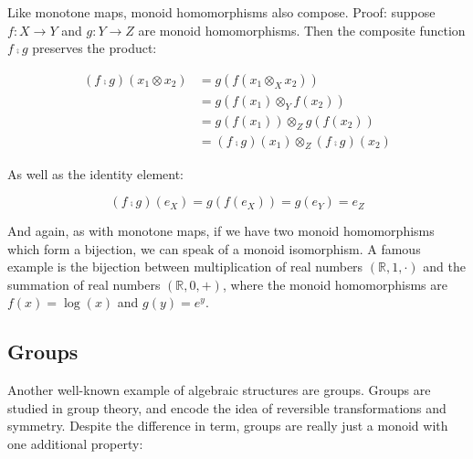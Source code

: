 \documentclass[
]{book}
\theoremstyle{definition}
\theoremstyle{definition}
\theoremstyle{definition}
\theoremstyle{definition}
\theoremstyle{remark}
\begin{document}
Like monotone maps, monoid homomorphisms also compose. Proof: suppose \(f: X \to Y\) and \(g: Y \to Z\) are monoid homomorphisms. Then the composite function \(f ⨾g\) preserves the product:

\begin{align}
(f ⨾g)(x_1 \otimes x_2) & = g(f(x_1 \otimes_X x_2)) \\
& = g(f(x_1) \otimes_Y f(x_2)) \\
& = g(f(x_1)) \otimes_Z g(f(x_2)) \\
& = (f ⨾g)(x_1) \otimes_Z (f ⨾g)(x_2)
\end{align}

As well as the identity element:

\[(f ⨾g)(e_X) = g(f(e_X)) = g(e_Y) = e_Z\]

And again, as with monotone maps, if we have two monoid homomorphisms which form a bijection, we can speak of a monoid isomorphism. A famous example is the bijection between multiplication of real numbers \((\mathbb{R}, 1, \cdot)\) and the summation of real numbers \((\mathbb{R}, 0, +)\), where the monoid homomorphisms are \(f(x) = \log(x)\) and \(g(y) = e^y\).

\subsection{Groups}\label{groups}

Another well-known example of algebraic structures are groups. Groups are studied in group theory, and encode the idea of reversible transformations and symmetry. Despite the difference in term, groups are really just a monoid with one additional property:
\end{document}
